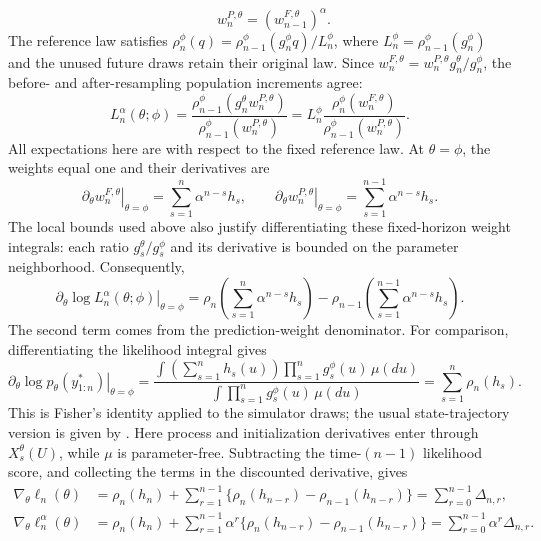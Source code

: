 \documentclass[11pt]{article}
\theoremstyle{thmstylethree}%
\begin{document}
{\[\qquad
w_n^{P,\theta}=(w_{n-1}^{F,\theta})^\alpha.
\]
The reference law satisfies
$\rho_n^\phi(q)=\rho_{n-1}^\phi(g_n^\phi q)/L_n^\phi$, where
$L_n^\phi=\rho_{n-1}^\phi(g_n^\phi)$ and the unused future draws retain
their original law. Since $w_n^{F,\theta}=w_n^{P,\theta}g_n^\theta/g_n^\phi$,
the before- and after-resampling population increments agree:
\[
L_n^\alpha(\theta;\phi)
=\frac{\rho_{n-1}^\phi(g_n^\theta w_n^{P,\theta})}
       {\rho_{n-1}^\phi(w_n^{P,\theta})}
=L_n^\phi\frac{\rho_n^\phi(w_n^{F,\theta})}
                  {\rho_{n-1}^\phi(w_n^{P,\theta})}.
\]
All expectations here are with respect to the fixed reference law.
At $\theta=\phi$, the weights equal one and their derivatives are
\[
\left.\partial_\theta w_n^{F,\theta}\right|_{\theta=\phi}
=\sum_{s=1}^n\alpha^{n-s}h_s,
\qquad
\left.\partial_\theta w_n^{P,\theta}\right|_{\theta=\phi}
=\sum_{s=1}^{n-1}\alpha^{n-s}h_s.
\]
The local bounds used above also justify differentiating these fixed-horizon
weight integrals: each ratio $g_s^\theta/g_s^\phi$ and its derivative is
bounded on the parameter neighborhood. Consequently,
\[
\left.\partial_\theta\log L_n^\alpha(\theta;\phi)\right|_{\theta=\phi}
=\rho_n\left(\sum_{s=1}^n\alpha^{n-s}h_s\right)
-\rho_{n-1}\left(\sum_{s=1}^{n-1}\alpha^{n-s}h_s\right).
\]
The second term comes from the prediction-weight denominator.
\endgraf
For comparison, differentiating the likelihood integral gives
\begin{equation}
\left.\partial_\theta\log p_\theta(y_{1:n}^*)\right|_{\theta=\phi}
=\frac{\int\!\left(\sum_{s=1}^n h_s(u)\right)
                 \prod_{s=1}^n g_s^\phi(u)\,\mu(du)}
       {\int\prod_{s=1}^n g_s^\phi(u)\,\mu(du)}
=\sum_{s=1}^n\rho_n(h_s).
\label{eq:full-population-score-path-average}
\end{equation}
This is Fisher's identity applied to the simulator draws; the usual
state-trajectory version is given by \citet[Equation~(4)]{poyiadjis11}.
Here process and initialization derivatives enter through $X_s^\theta(U)$,
while $\mu$ is parameter-free. Subtracting the time-$(n-1)$ likelihood
score, and collecting the terms in the discounted derivative, gives
\begin{align}
\nabla_\theta\ell_n(\theta)
&=\rho_n(h_n)+\sum_{r=1}^{n-1}
\{\rho_n(h_{n-r})-\rho_{n-1}(h_{n-r})\}
=\sum_{r=0}^{n-1}\Delta_{n,r},
\label{eq:exact-population-conditional-score-path-decomposition}\\
\nabla_\theta\ell_n^\alpha(\theta)
&=\rho_n(h_n)+\sum_{r=1}^{n-1}\alpha^r
\{\rho_n(h_{n-r})-\rho_{n-1}(h_{n-r})\}
=\sum_{r=0}^{n-1}\alpha^r\Delta_{n,r}.
\label{eq:population-conditional-score-path-decomposition}
\end{align}
\endgraf
}
\end{document}
